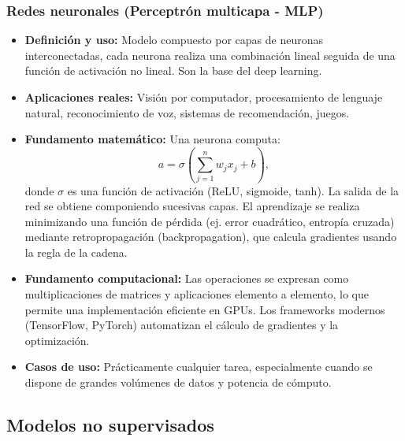 \documentclass[12pt,a4paper,openany,oneside]{book}
\begin{document}
\subsubsection{Redes neuronales (Perceptrón multicapa - MLP)}
\begin{itemize}
    \item \textbf{Definición y uso:} Modelo compuesto por capas de neuronas interconectadas, cada neurona realiza una combinación lineal seguida de una función de activación no lineal. Son la base del deep learning.
    \item \textbf{Aplicaciones reales:} Visión por computador, procesamiento de lenguaje natural, reconocimiento de voz, sistemas de recomendación, juegos.
    \item \textbf{Fundamento matemático:} Una neurona computa:
    \[
    a = \sigma\left( \sum_{j=1}^n w_j x_j + b \right),
    \]
    donde \(\sigma\) es una función de activación (ReLU, sigmoide, tanh). La salida de la red se obtiene componiendo sucesivas capas. El aprendizaje se realiza minimizando una función de pérdida (ej. error cuadrático, entropía cruzada) mediante retropropagación (backpropagation), que calcula gradientes usando la regla de la cadena.
    \item \textbf{Fundamento computacional:} Las operaciones se expresan como multiplicaciones de matrices y aplicaciones elemento a elemento, lo que permite una implementación eficiente en GPUs. Los frameworks modernos (TensorFlow, PyTorch) automatizan el cálculo de gradientes y la optimización.
    \item \textbf{Casos de uso:} Prácticamente cualquier tarea, especialmente cuando se dispone de grandes volúmenes de datos y potencia de cómputo.
\end{itemize}

\subsection{Modelos no supervisados}
\end{document}
